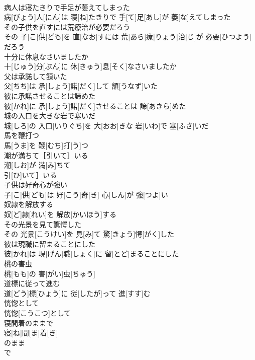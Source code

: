 \documentclass[8pt]{extreport}
\begin{document}
\begin{CJK}{UTF8}{min}
\\	病人は寝たきりで手足が萎えてしまった	
\\	病[びょう]人[にん]は 寝[ね]たきりで 手[て]足[あし]が 萎[な]えてしまった
\\	その子供を直すには荒療治が必要だろう	
\\	その 子[こ]供[ども]を 直[なお]すには 荒[あら]療[りょう]治[じ]が 必要[ひつよう]だろう
\\	十分に休息なさいましたか	
\\	十[じゅう]分[ぶん]に 休[きゅう]息[そく]なさいましたか
\\	父は承諾して頷いた	
\\	父[ちち]は 承[しょう]諾[だく]して 頷[うなず]いた
\\	彼に承諾させることは諦めた	
\\	彼[かれ]に 承[しょう]諾[だく]させることは 諦[あきら]めた
\\	城の入口を大きな岩で塞いだ	
\\	城[しろ]の 入口[いりぐち]を 大[おお]きな 岩[いわ]で 塞[ふさ]いだ
\\	馬を鞭打つ	
\\	馬[うま]を 鞭[むち]打[う]つ
\\	潮が満ちて［引いて］いる	
\\	潮[しお]が 満[み]ちて
\\	引[ひ]いて］いる
\\	子供は好奇心が強い	
\\	子[こ]供[ども]は 好[こう]奇[き] 心[しん]が 強[つよ]い
\\	奴隷を解放する	
\\	奴[ど]隷[れい]を 解放[かいほう]する
\\	その光景を見て驚愕した	
\\	その 光景[こうけい]を 見[み]て 驚[きょう]愕[がく]した
\\	彼は現職に留まることにした	
\\	彼[かれ]は 現[げん]職[しょく]に 留[とど]まることにした
\\	桃の害虫	
\\	桃[もも]の 害[がい]虫[ちゅう]
\\	道標に従って進む	
\\	道[どう]標[ひょう]に 従[したが]って 進[すす]む
\\	恍惚として	
\\	恍惚[こうこつ]として
\\	寝間着のままで	
\\	寝[ね]間[ま]着[き]
\\	のまま 
\\	で

\end{CJK}
\end{document}
